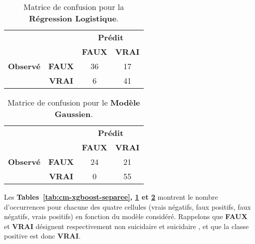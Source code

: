 \begin{table}[H]
	\centering
	\caption{Matrice de confusion pour la \textbf{Régression Logistique}.}
	\label{tab:cm-glm-separee}
	\begin{tabular}{cc|cc}
		\toprule
		& & \multicolumn{2}{c}{\textbf{Prédit}} \\
		& & \textbf{FAUX} & \textbf{VRAI} \\
		\midrule
		\textbf{Observé}
		& \textbf{FAUX} & 36 & 17 \\
		& \textbf{VRAI} & 6  & 41 \\
		\bottomrule
	\end{tabular}
\end{table}

\begin{table}[H]
	\centering
	\caption{Matrice de confusion pour le \textbf{Modèle Gaussien}.}
	\label{tab:cm-gaussien-separee}
	\begin{tabular}{cc|cc}
		\toprule
		& & \multicolumn{2}{c}{\textbf{Prédit}} \\
		& & \textbf{FAUX} & \textbf{VRAI} \\
		\midrule
		\textbf{Observé}
		& \textbf{FAUX} & 24 & 21 \\
		& \textbf{VRAI} & 0  & 55 \\
		\bottomrule
	\end{tabular}
\end{table}

\noindent
Les \textbf{Tables~\ref{tab:cm-xgboost-separee}, \ref{tab:cm-glm-separee} et \ref{tab:cm-gaussien-separee}}
montrent le nombre d’occurrences pour chacune des quatre cellules (vrais négatifs, faux positifs, 
faux négatifs, vrais positifs) en fonction du modèle considéré. Rappelons que \textbf{FAUX} et \textbf{VRAI} 
désignent respectivement \og non suicidaire \fg{} et \og suicidaire \fg, et que la \og classe positive \fg{} 
est donc \textbf{VRAI}.

\vspace{1em}

